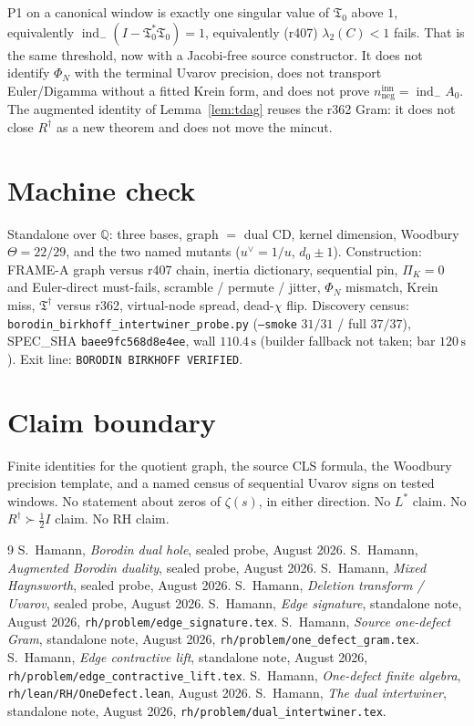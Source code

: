 \documentclass[11pt]{article}
\theoremstyle{remark}
\newcommand{\indm}{\operatorname{ind}_{-}}
\newcommand{\half}{\tfrac12}
\newcommand{\Tfrak}{\mathfrak{T}}
\begin{document}
P1 on a canonical window is exactly one singular value of
$\Tfrak_0$ above $1$, equivalently $\indm(I-\Tfrak_0^*\Tfrak_0)=1$,
equivalently (r407) $\lambda_2(C)<1$ fails.
That is the same threshold, now with a Jacobi-free source
constructor.
It does not identify $\Phi_N$ with the terminal Uvarov
precision, does not transport Euler/Digamma without a fitted
Krein form, and does not prove $n_{\mathrm{neg}}^{\mathrm{inn}}=\indm A_0$.
The augmented identity of Lemma~\ref{lem:tdag} reuses the
r362 Gram: it does not close $R^\dagger$ as a new theorem
and does not move the mincut.

\section*{Machine check}

Standalone over $\mathbb{Q}$: three bases, graph $=$ dual CD,
kernel dimension, Woodbury $\Theta=22/29$, and the two named
mutants ($u^\vee=1/u$, $d_0\pm 1$).
Construction: FRAME-A graph versus r407 chain, inertia
dictionary, sequential pin, $\Pi_K=0$ and Euler-direct
must-fails, scramble / permute / jitter, $\Phi_N$ mismatch,
Krein miss, $\Tfrak^\dagger$ versus r362, virtual-node spread,
dead-$\chi$ flip.
Discovery census:
\texttt{borodin\_birkhoff\_intertwiner\_probe.py}
(\texttt{--smoke} $31/31$ / full $37/37$), SPEC\_SHA
\texttt{baee9fc568d8e4ee}, wall $110.4\,\mathrm{s}$
(builder fallback not taken; bar $120\,\mathrm{s}$).
Exit line: \texttt{BORODIN BIRKHOFF VERIFIED}.

\section*{Claim boundary}

Finite identities for the quotient graph, the source CLS
formula, the Woodbury precision template, and a named
census of sequential Uvarov signs on tested windows.
No statement about zeros of $\zeta(s)$, in either direction.
No $L^*$ claim.
No $R^\dagger\succ\half I$ claim.
No RH claim.

\begin{thebibliography}{9}
S.~Hamann,
\textit{Borodin dual hole},
sealed probe, August 2026.
S.~Hamann,
\textit{Augmented Borodin duality},
sealed probe, August 2026.
S.~Hamann,
\textit{Mixed Haynsworth},
sealed probe, August 2026.
S.~Hamann,
\textit{Deletion transform / Uvarov},
sealed probe, August 2026.
S.~Hamann,
\textit{Edge signature},
standalone note, August 2026,
\texttt{rh/problem/edge\_signature.tex}.
S.~Hamann,
\textit{Source one-defect Gram},
standalone note, August 2026,
\texttt{rh/problem/one\_defect\_gram.tex}.
S.~Hamann,
\textit{Edge contractive lift},
standalone note, August 2026,
\texttt{rh/problem/edge\_contractive\_lift.tex}.
S.~Hamann,
\textit{One-defect finite algebra},
\texttt{rh/lean/RH/OneDefect.lean}, August 2026.
S.~Hamann,
\textit{The dual intertwiner},
standalone note, August 2026,
\texttt{rh/problem/dual\_intertwiner.tex}.
\end{thebibliography}
\end{document}
